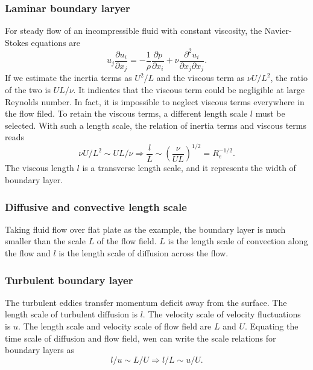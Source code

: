 \documentclass[review]{elsarticle}
\numberwithin{equation}{section}
\begin{document}
		\subsubsection{Laminar boundary laryer}
			For steady flow of an incompressible fluid with constant viscosity, the Navier-Stokes equations are
			\begin{equation}\label{NS1}
				u_j\frac{\partial u_i}{\partial x_j} = -\frac{1}{\rho}\frac{\partial p}{\partial x_i} 
					+ \nu \frac{\partial ^2u_i}{\partial x_j\partial x_j}.			
			\end{equation}
			If we estimate the inertia terms as $U^2/L$ and the viscous term as $\nu U/L^2$, the ratio of the two 
			is $UL/\nu$. It indicates that the viscous term could be negligible at large Reynolds number. In fact, 
			it is impossible to neglect viscous terms everywhere in the flow filed. To retain the viscous terms, a 
			different length scale $l$ must be selected. With such a length scale, the relation of inertia terms and 
			viscous terms reads
			\begin{equation}
				\nu U/L^2 \sim UL/\nu \Rightarrow \frac{l}{L} \sim \left( \frac{\nu}{UL}\right)^{1/2}=R^{-1/2}_e. 
			\end{equation}
			The viscous length $l$ is a transverse length scale, and it represents the width of boundary layer.
		\subsubsection{Diffusive and convective length scale}
			Taking fluid flow over flat plate as the example, the boundary layer is much smaller than the scale $L$ 
			of the flow field. $L$ is the length scale of convection along the flow and $l$ is the length scale of 
			diffusion across the flow. 
		\subsubsection{Turbulent boundary layer}
			The turbulent eddies transfer momentum deficit away from the surface. The length scale of turbulent diffusion 
			is $l$. The velocity scale of velocity fluctuations is $u$. The length scale and velocity scale of flow field 
			are $L$ and $U$. Equating the time scale of diffusion and flow field, wen can write the scale relations for 
			boundary layers as
			\begin{equation}
				l/u \sim L/U \Rightarrow l/L \sim u/U.
			\end{equation}
			\begin{center}
			\end{center}
						
\end{document}
